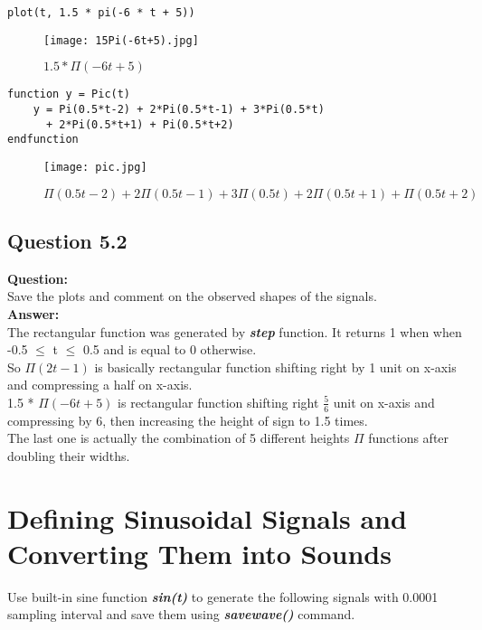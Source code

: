 \documentclass[12pt,fleqn]{article}
\begin{document}
\begin{lstlisting}[frame=single]
plot(t, 1.5 * pi(-6 * t + 5))
\end{lstlisting}
\begin{figure}[H]
\centering
\texttt{[image: 15Pi(-6t+5).jpg]}
\caption{$1.5*\Pi(-6t+5)$}
\end{figure}

\begin{lstlisting}[frame=single]
function y = Pic(t)
    y = Pi(0.5*t-2) + 2*Pi(0.5*t-1) + 3*Pi(0.5*t) 
      + 2*Pi(0.5*t+1) + Pi(0.5*t+2)
endfunction
\end{lstlisting}
\begin{figure}[H]
\centering
\texttt{[image: pic.jpg]}
\caption{$\Pi(0.5t-2)+2\Pi(0.5t-1)+3\Pi(0.5t)+2\Pi(0.5t+1)+\Pi(0.5t+2)$}
\end{figure}

\subsection{Question 5.2}
\textbf{Question:}\\
Save the plots and comment on the observed shapes of the signals.\\
\textbf{Answer:}\\
The rectangular function was generated by \emph{\textbf{step}} function. It returns 1 when when -0.5 $\leq$ t $\leq$ 0.5 and is equal to 0 otherwise.\\
So $\Pi(2t-1)$ is basically rectangular function shifting right by 1 unit on x-axis and compressing a half on x-axis.\\
1.5 * $\Pi(-6t+5)$ is rectangular function shifting right $\frac{5}{6}$ unit on x-axis and compressing by 6, then increasing the height of sign to 1.5 times.\\
The last one is actually the combination of 5 different heights $\Pi$ functions after doubling their widths. 

\section{Defining Sinusoidal Signals and Converting Them into Sounds}
Use built-in sine function \emph{\textbf{sin(t)}} to generate the following signals with 0.0001 sampling interval and save them using \emph{\textbf{savewave()}} command.
\end{document}
